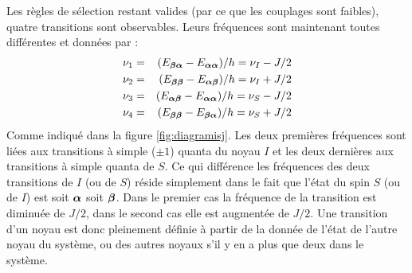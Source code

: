 Les règles de sélection restant valides (par ce que les couplages sont faibles),
quatre transitions sont observables.
Leurs fréquences sont maintenant toutes différentes et données par :
\begin{eqnarray}
\nu_1 & = & (E_{\boldsymbol{\beta}\boldsymbol{\alpha}} - E_{\boldsymbol{\alpha}\boldsymbol{\alpha}})/h = \nu_I - J/2 \\
\nu_2 & = & (E_{\boldsymbol{\beta}\boldsymbol{\beta}} - E_{\boldsymbol{\alpha}\boldsymbol{\beta}})/h = \nu_I + J/2 \\
\nu_3 & = & (E_{\boldsymbol{\alpha}\boldsymbol{\beta}} - E_{\boldsymbol{\alpha}\boldsymbol{\alpha}})/h = \nu_S - J/2 \\
\nu_4 & = & (E_{\boldsymbol{\beta}\boldsymbol{\beta}} - E_{\boldsymbol{\beta}\boldsymbol{\alpha}})/h = \nu_S + J/2
\end{eqnarray}
Comme indiqué dans la figure \ref{fig:diagramisj}.
Les deux premières fréquences sont liées aux transitions à simple ($\pm 1$) quanta
du noyau $I$ et les deux dernières aux transitions à simple quanta
de $S$.
Ce qui différence les fréquences des deux transitions de $I$ (ou de $S$)
réside simplement dans le fait que l'état du spin $S$ (ou de $I$)
est soit $\boldsymbol{\alpha}$ soit $\boldsymbol{\beta}$.
Dans le premier cas la fréquence de la transition est diminuée de $J/2$,
dans le second cas elle est augmentée de $J/2$.
Une transition d'un noyau est donc pleinement définie à partir de la
donnée de l'état de l'autre noyau du système, ou des autres noyaux s'il
y en a plus que deux dans le système.

